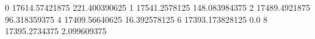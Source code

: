 0 17614.57421875 221.400390625
1 17541.2578125 148.083984375
2 17489.4921875 96.318359375
4 17409.56640625 16.392578125
6 17393.173828125 0.0
8 17395.2734375 2.099609375
